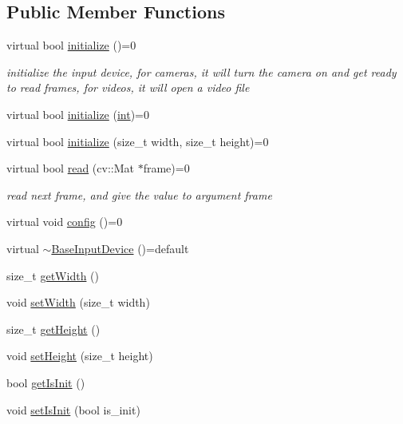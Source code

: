 \subsection*{Public Member Functions}
\begin{DoxyCompactItemize}
\item 
virtual bool \hyperlink{classBaseInputDevice_a487cef7725bab9c8cd7141b9b2f83eea}{initialize} ()=0
\begin{DoxyCompactList}\small\item\em initialize the input device, for cameras, it will turn the camera on and get ready to read frames, for videos, it will open a video file \end{DoxyCompactList}\item 
virtual bool \hyperlink{classBaseInputDevice_a7fb82b301d42d63e1b98455eb88ccddd}{initialize} (\hyperlink{CMakeCache_8txt_a79a3d8790b2588b09777910863574e09}{int})=0
\item 
virtual bool \hyperlink{classBaseInputDevice_a8ad1f513052fd4c43e030c3958808bfa}{initialize} (size\+\_\+t width, size\+\_\+t height)=0
\item 
virtual bool \hyperlink{classBaseInputDevice_a49b0a9ff7286d5fb3bccf61a0baaa32a}{read} (cv\+::\+Mat $\ast$frame)=0
\begin{DoxyCompactList}\small\item\em read next frame, and give the value to argument frame \end{DoxyCompactList}\item 
virtual void \hyperlink{classBaseInputDevice_a6f88b6eae38b58dd534f082690f840b3}{config} ()=0
\item 
virtual \hyperlink{classBaseInputDevice_af3f4d01b6e32f62ea6b3d475f12a1a5a}{$\sim$\+Base\+Input\+Device} ()=default
\item 
size\+\_\+t \hyperlink{classBaseInputDevice_a27846cadcc13830798fa92be6800f764}{get\+Width} ()
\item 
void \hyperlink{classBaseInputDevice_a980073308aee4edf67d43a85fdaa2f81}{set\+Width} (size\+\_\+t width)
\item 
size\+\_\+t \hyperlink{classBaseInputDevice_ad38b119a840adacf04c16d75462fc4b7}{get\+Height} ()
\item 
void \hyperlink{classBaseInputDevice_a3312adc6b71bc08da39b5df1be565cef}{set\+Height} (size\+\_\+t height)
\item 
bool \hyperlink{classBaseInputDevice_a560fe86d007739992af04198237909a5}{get\+Is\+Init} ()
\item 
void \hyperlink{classBaseInputDevice_a92e8c0f893c1eb9dcbdd7fb38daf5da1}{set\+Is\+Init} (bool is\+\_\+init)
\end{DoxyCompactItemize}


